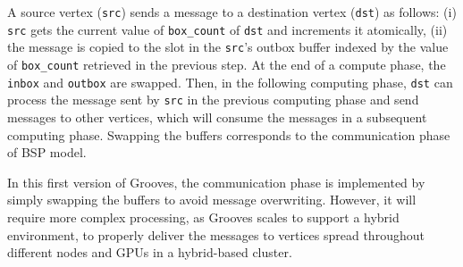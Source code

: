 A source vertex (\texttt{src}) sends a message to a destination vertex (\texttt{dst}) as follows: (i) \texttt{src} gets the current value of \texttt{box\_count} of \texttt{dst} and increments it atomically, (ii) the message is copied to the slot in the \texttt{src}'s outbox buffer indexed by the value of \texttt{box\_count} retrieved in the previous step. At the end of a compute phase, the \texttt{inbox} and \texttt{outbox} are swapped. Then, in the following computing phase, \texttt{dst} can process the message sent by \texttt{src} in the previous computing phase and send messages to other vertices, which will consume the messages in a subsequent computing phase. Swapping the buffers corresponds to the communication phase of BSP model. 

In this first version of {\sc Grooves}, the communication phase is implemented by simply swapping the buffers to avoid message overwriting. However, it will require more complex processing, as {\sc Grooves} scales to support a hybrid environment, to properly deliver the messages to vertices spread throughout different nodes and GPUs in a hybrid-based cluster. 
